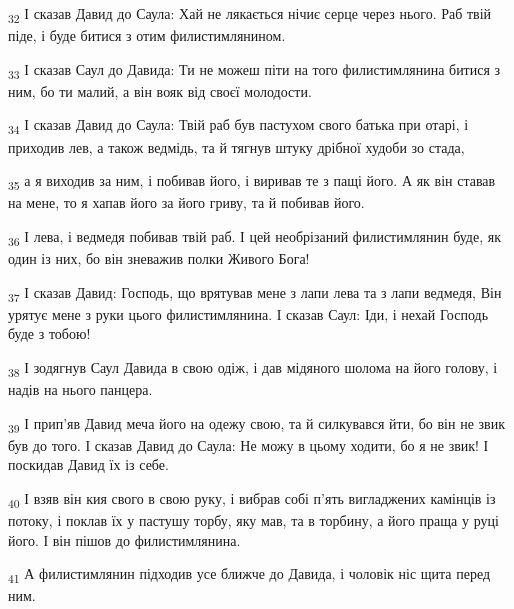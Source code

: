 \begin{tcolorbox}
\textsubscript{32} І сказав Давид до Саула: Хай не лякається нічиє серце через нього. Раб твій піде, і буде битися з отим филистимлянином.
\end{tcolorbox}
\begin{tcolorbox}
\textsubscript{33} І сказав Саул до Давида: Ти не можеш піти на того филистимлянина битися з ним, бо ти малий, а він вояк від своєї молодости.
\end{tcolorbox}
\begin{tcolorbox}
\textsubscript{34} І сказав Давид до Саула: Твій раб був пастухом свого батька при отарі, і приходив лев, а також ведмідь, та й тягнув штуку дрібної худоби зо стада,
\end{tcolorbox}
\begin{tcolorbox}
\textsubscript{35} а я виходив за ним, і побивав його, і виривав те з пащі його. А як він ставав на мене, то я хапав його за його гриву, та й побивав його.
\end{tcolorbox}
\begin{tcolorbox}
\textsubscript{36} І лева, і ведмедя побивав твій раб. І цей необрізаний филистимлянин буде, як один із них, бо він зневажив полки Живого Бога!
\end{tcolorbox}
\begin{tcolorbox}
\textsubscript{37} І сказав Давид: Господь, що врятував мене з лапи лева та з лапи ведмедя, Він урятує мене з руки цього филистимлянина. І сказав Саул: Іди, і нехай Господь буде з тобою!
\end{tcolorbox}
\begin{tcolorbox}
\textsubscript{38} І зодягнув Саул Давида в свою одіж, і дав мідяного шолома на його голову, і надів на нього панцера.
\end{tcolorbox}
\begin{tcolorbox}
\textsubscript{39} І прип'яв Давид меча його на одежу свою, та й силкувався йти, бо він не звик був до того. І сказав Давид до Саула: Не можу в цьому ходити, бо я не звик! І поскидав Давид їх із себе.
\end{tcolorbox}
\begin{tcolorbox}
\textsubscript{40} І взяв він кия свого в свою руку, і вибрав собі п'ять вигладжених камінців із потоку, і поклав їх у пастушу торбу, яку мав, та в торбину, а його праща у руці його. І він пішов до филистимлянина.
\end{tcolorbox}
\begin{tcolorbox}
\textsubscript{41} А филистимлянин підходив усе ближче до Давида, і чоловік ніс щита перед ним.
\end{tcolorbox}
